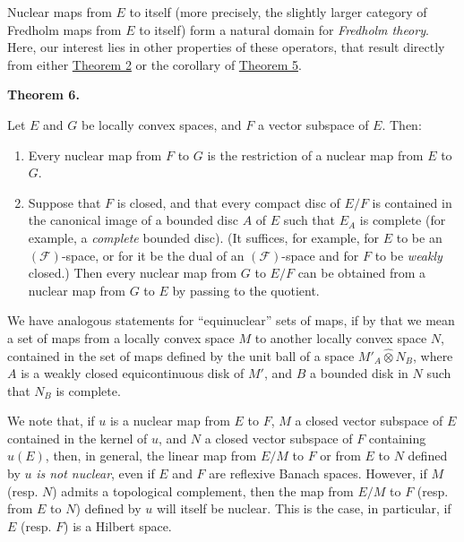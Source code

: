 \documentclass[british]{article}
\newenvironment{itenv}[1]
  {\phantomsection\par\smallskip\noindent\textbf{#1.}\itshape}
  {\par\smallskip}
\newcommand{\oldpage}[1]{\marginpar{\footnotesize$\Big\vert$ \textit{p.~#1}}}
\begin{document}
Nuclear maps from \(E\) to itself (more precisely, the slightly larger
category of Fredholm maps from \(E\) to itself) form a natural domain
for \emph{Fredholm theory}. Here, our interest lies in other properties
of these operators, that result directly from either
\hyperref[section-1-theorem-2]{Theorem 2} or the corollary of
\hyperref[section-1-theorem-5]{Theorem 5}.

\protect{}\label{section-1-theorem-6}
\begin{itenv}{Theorem 6}

Let \(E\) and \(G\) be locally convex spaces, and \(F\) a vector
subspace of \(E\). Then:

\begin{enumerate}
\def\labelenumi{\alph{enumi}.}
\item
  Every nuclear map from \(F\) to \(G\) is the restriction of a nuclear
  map from \(E\) to \(G\).
\item
  Suppose that \(F\) is closed, and that every compact disc of \(E/F\)
  is contained in the canonical image of a bounded disc \(A\) of \(E\)
  such that \(E_A\) is complete (for example, a \emph{complete} bounded
  disc). (It suffices, for example, for \(E\) to be an
  \((\mathscr{F})\)-space, or for it be the dual of an
  \((\mathscr{F})\)-space and for \(F\) to be \emph{weakly} closed.)
  Then every nuclear map from \(G\) to \(E/F\) can be obtained from a
  nuclear map from \(G\) to \(E\) by passing to the quotient.
\end{enumerate}

\end{itenv}

We have analogous statements for ``equinuclear'' sets of maps, if by
that we mean a set of maps from a locally convex space \(M\) to another
locally convex space \(N\), contained in the set of maps defined by the
unit ball of a space \(M'_A\hat{\otimes}N_B\), where \(A\) is a weakly
closed equicontinuous disk of \(M'\), and \(B\) a bounded disk in \(N\)
such that \(N_B\) is complete.

\oldpage{87}

We note that, if \(u\) is a nuclear map from \(E\) to \(F\), \(M\) a
closed vector subspace of \(E\) contained in the kernel of \(u\), and
\(N\) a closed vector subspace of \(F\) containing \(u(E)\), then, in
general, the linear map from \(E/M\) to \(F\) or from \(E\) to \(N\)
defined by \(u\) \emph{is not nuclear}, even if \(E\) and \(F\) are
reflexive Banach spaces. However, if \(M\) (resp. \(N\)) admits a
topological complement, then the map from \(E/M\) to \(F\) (resp. from
\(E\) to \(N\)) defined by \(u\) will itself be nuclear. This is the
case, in particular, if \(E\) (resp. \(F\)) is a Hilbert space.
\end{document}
